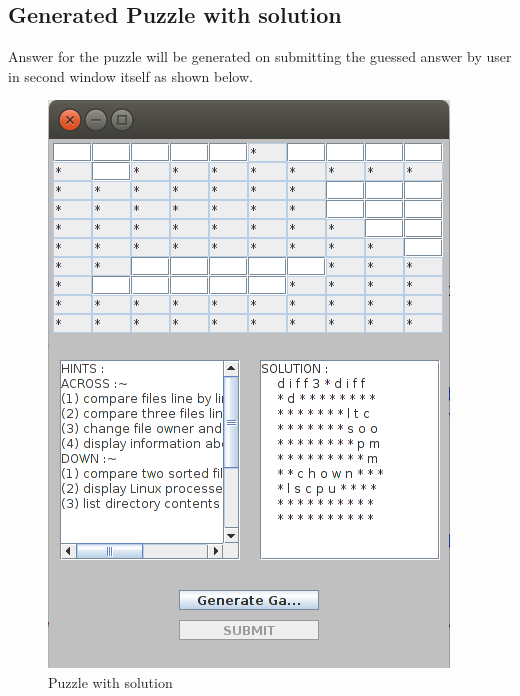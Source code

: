 \subsection{Generated Puzzle with solution}
Answer for the puzzle will be generated on submitting the guessed answer by user in second window itself as shown below. 
\begin{figure}[!ht]
\centering
\includegraphics[scale=0.6]{sol.png}
\caption{\label{img5} Puzzle with solution }
\end{figure}




